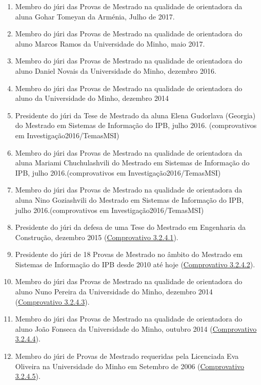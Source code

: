 \documentclass[11pt]{article}
\begin{document}
\begin{enumerate}
\item {Membro do júri das Provas de Mestrado  na qualidade de orientadora da aluna Gohar Tomeyan da Arménia, Julho de 2017.}
\item {Membro do júri das Provas de Mestrado na qualidade de orientadora do aluno Marcos Ramos da Universidade do Minho, maio 2017.}
\item {Membro do júri das Provas de Mestrado na qualidade de orientadora do aluno Daniel Novais da Universidade do Minho, dezembro 2016.}
\item {Membro do júri das Provas de Mestrado na qualidade de orientadora do aluno  da Universidade do Minho, dezembro 2014 }
\item {Presidente do júri da Tese de Mestrado da aluna Elena Gudorlava (Georgia) do Mestrado em Sistemas de Informação do IPB, julho 2016. (comprovativos em Investigação2016/TemasMSI)}
\item {Membro do júri das Provas de Mestrado na qualidade de orientadora da aluna Mariami Chuchulashvili do Mestrado em Sistemas de Informação do IPB, julho 2016.(comprovativos em Investigação2016/TemasMSI)}
\item {Membro do júri das Provas de Mestrado na qualidade de orientadora da aluna Nino Goziashvili do Mestrado em Sistemas de Informação do IPB, julho 2016.(comprovativos em Investigação2016/TemasMSI)}
\item {Presidente do júri da defesa de uma Tese do Mestrado em Engenharia da Construção, dezembro 2015 (\href{run:JuriProvas/PresidenteMEC.pdf}{Comprovativo 3.2.4.1}).}
\item {Presidente do júri de 18 Provas de Mestrado no âmbito do Mestrado em Sistemas de Informação do IPB desde 2010 até hoje (\href{run:JuriProvas/TeseMSI.pdf}{Comprovativo 3.2.4.2}).}
\item {Membro do júri das Provas de Mestrado na qualidade de orientadora do aluno Nuno Pereira da Universidade do Minho, dezembro 2014 (\href{run:JuriProvas/juriNunoPereira.pdf}{Comprovativo 3.2.4.3}).}
\item {Membro do júri das Provas de Mestrado na qualidade de orientadora do aluno João Fonseca da Universidade do Minho, outubro 2014 (\href{run:JuriProvas/juriJoaoFonseca.pdf}{Comprovativo 3.2.4.4}).}
\item {Membro do júri de Provas de Mestrado requeridas pela Licenciada Eva Oliveira na Universidade do Minho em Setembro de 2006 (\href{run:JuriProvas/JuriMestradoEva.pdf}{Comprovativo 3.2.4.5}).}
\end{enumerate}
\end{document}
